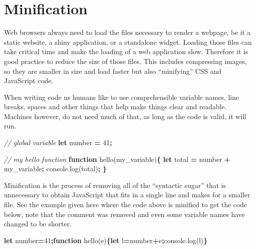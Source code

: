 \documentclass[
]{krantz}
\makeatletter
\newenvironment{Shaded}{\begin{snugshade}}{\end{snugshade}}
\newcommand{\AttributeTok}[1]{\textcolor[rgb]{0.61,0.61,0.61}{#1}}
\newcommand{\CommentTok}[1]{\textcolor[rgb]{0.37,0.37,0.37}{\textit{#1}}}
\newcommand{\DecValTok}[1]{\textcolor[rgb]{0.06,0.06,0.06}{#1}}
\newcommand{\KeywordTok}[1]{\textcolor[rgb]{0.27,0.27,0.27}{\textbf{#1}}}
\newcommand{\NormalTok}[1]{#1}
\newcommand{\OperatorTok}[1]{\textcolor[rgb]{0.43,0.43,0.43}{\textbf{#1}}}
\newcommand{\VariableTok}[1]{\textcolor[rgb]{0,0,0}{#1}}
\newenvironment{kframe}{%
\medskip{}
\setlength{\fboxsep}{.8em}
 \def\at@end@of@kframe{}%
 \ifinner\ifhmode%
  \def\at@end@of@kframe{\end{minipage}}%
  \begin{minipage}{\columnwidth}%
 \fi\fi%
 \def\FrameCommand##1{\hskip\@totalleftmargin \hskip-\fboxsep
 \colorbox{shadecolor}{##1}\hskip-\fboxsep
     \hskip-\linewidth \hskip-\@totalleftmargin \hskip\columnwidth}%
 \MakeFramed {\advance\hsize-\width
   \@totalleftmargin\z@ \linewidth\hsize
   \@setminipage}}%
 {\par\unskip\endMakeFramed%
 \at@end@of@kframe}
\renewenvironment{Shaded}{\begin{kframe}}{\end{kframe}}
\makeatother
\begin{document}
\hypertarget{webpack-minification}{%
\section{Minification}\label{webpack-minification}}

Web browsers always need to load the files necessary to render a webpage, be it a static website, a shiny application, or a standalone widget. Loading those files can take critical time and make the loading of a web application slow. Therefore it is good practice to reduce the size of those files. This includes compressing images, so they are smaller in size and load faster but also ``minifying'' CSS and JavaScript code.

When writing code us humans like to use comprehensible variable names, line breaks, spaces and other things that help make things clear and readable. Machines however, do not need much of that, as long as the code is valid, it will run.

\begin{Shaded}
\begin{Highlighting}[]
\CommentTok{// global variable}
\KeywordTok{let}\NormalTok{ number }\OperatorTok{=} \DecValTok{41}\OperatorTok{;}

\CommentTok{// my hello function}
\KeywordTok{function} \AttributeTok{hello}\NormalTok{(my\_variable)}\OperatorTok{\{}
    \KeywordTok{let}\NormalTok{ total }\OperatorTok{=}\NormalTok{ number }\OperatorTok{+}\NormalTok{ my\_variable}\OperatorTok{;}
    \VariableTok{console}\NormalTok{.}\AttributeTok{log}\NormalTok{(total)}\OperatorTok{;}
\OperatorTok{\}}
\end{Highlighting}
\end{Shaded}

Minification is the process of removing all of the ``syntactic sugar'' that is unnecessary to obtain JavaScript that fits in a single line and makes for a smaller file. See the example given here where the code above is minified to get the code below, note that the comment was removed and even some variable names have changed to be shorter.

\begin{Shaded}
\begin{Highlighting}[]
\KeywordTok{let}\NormalTok{ number}\OperatorTok{=}\DecValTok{41}\OperatorTok{;}\KeywordTok{function} \AttributeTok{hello}\NormalTok{(e)}\OperatorTok{\{}\KeywordTok{let}\NormalTok{ l}\OperatorTok{=}\NormalTok{number}\OperatorTok{+}\NormalTok{e}\OperatorTok{;}\VariableTok{console}\NormalTok{.}\AttributeTok{log}\NormalTok{(l)}\OperatorTok{\}}
\end{Highlighting}
\end{Shaded}
\end{document}
